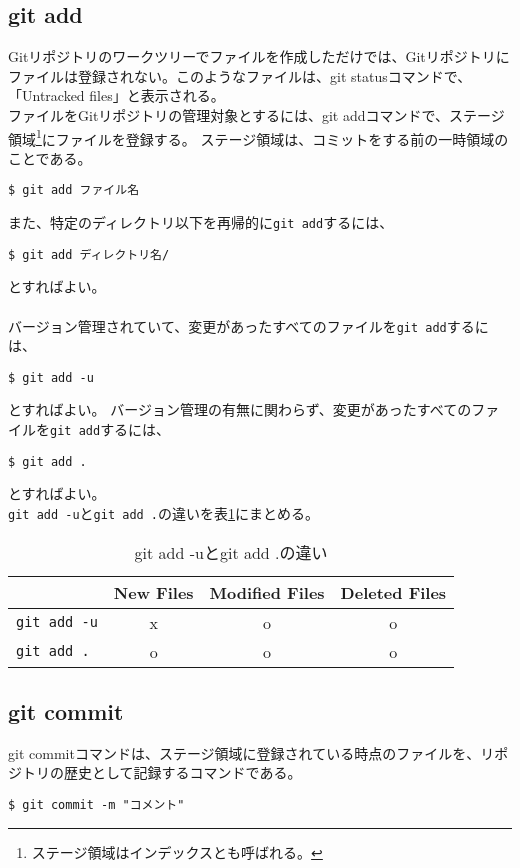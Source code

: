 \documentclass[11pt, oneside]{article}   	%
\begin{document}
\subsection{git add}
Gitリポジトリのワークツリーでファイルを作成しただけでは、Gitリポジトリにファイルは登録されない。このようなファイルは、git statusコマンドで、「Untracked files」と表示される。\\
ファイルをGitリポジトリの管理対象とするには、git addコマンドで、ステージ領域\footnote{ステージ領域はインデックスとも呼ばれる。}にファイルを登録する。
ステージ領域は、コミットをする前の一時領域のことである。
\begin{lstlisting}
$ git add ファイル名
\end{lstlisting}
また、特定のディレクトリ以下を再帰的に\verb|git add|するには、
\begin{lstlisting}
$ git add ディレクトリ名/
\end{lstlisting}
とすればよい。\\
 \\
 バージョン管理されていて、変更があったすべてのファイルを\verb|git add|するには、
 \begin{lstlisting}
$ git add -u
\end{lstlisting}
とすればよい。
バージョン管理の有無に関わらず、変更があったすべてのファイルを\verb|git add|するには、
 \begin{lstlisting}
$ git add .
\end{lstlisting}
とすればよい。\\
\verb|git add -u|と\verb|git add .|の違いを表\ref{tab:git_add_u}にまとめる。
\begin{table}[htb]
\begin{center}
\caption{git add -uとgit add .の違い}
\label{tab:git_add_u}
  \begin{tabular}{|l|c|c||c|} \hline
     & New Files & Modified Files & Deleted Files \\ \hline \hline
    \verb|git add -u| & x & o & o \\ \hline
    \verb|git add .| & o & o & o \\ \hline
  \end{tabular}
\end{center}
\end{table}



\subsection{git commit}
git commitコマンドは、ステージ領域に登録されている時点のファイルを、リポジトリの歴史として記録するコマンドである。
\begin{lstlisting}
$ git commit -m "コメント"
\end{lstlisting}
\end{document}
